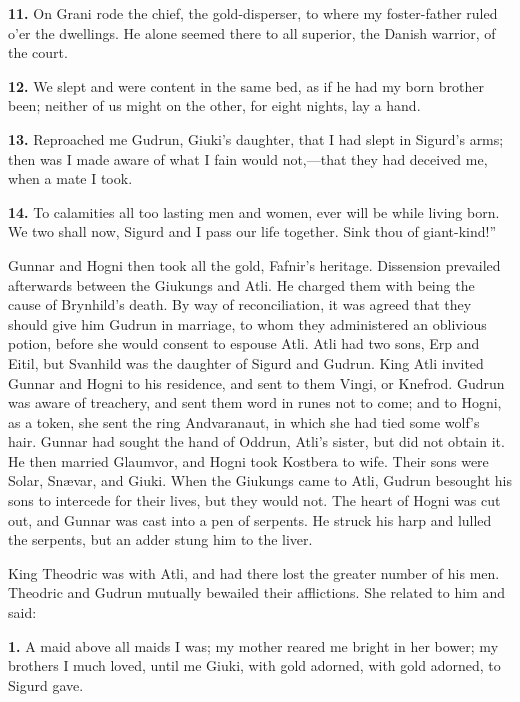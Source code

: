 \textbf{11.} On Grani rode the chief, the gold-disperser, to where my
foster-father ruled o'er the dwellings. He alone seemed there to all
superior, the Danish warrior, of the court.

\textbf{12.} We slept and were content in the same bed, as if he had my born
brother been; neither of us might on the other, for eight nights, lay
a hand.

\textbf{13.} Reproached me Gudrun, Giuki's daughter, that I had slept in
Sigurd's arms; then was I made aware of what I fain would not,—that
they had deceived me, when a mate I took.

\textbf{14.} To calamities all too lasting men and women, ever will be while
living born. We two shall now, Sigurd and I pass our life together.
Sink thou of giant-kind!''


Gunnar and Hogni then took all the gold, Fafnir's heritage. Dissension
prevailed afterwards between the Giukungs and Atli. He charged them
with being the cause of Brynhild's death. By way of reconciliation, it
was agreed that they should give him Gudrun in marriage, to whom they
administered an oblivious potion, before she would consent to espouse
Atli. Atli had two sons, Erp and Eitil, but Svanhild was the daughter
of Sigurd and Gudrun. King Atli invited Gunnar and Hogni to his
residence, and sent to them Vingi, or Knefrod. Gudrun was aware of
treachery, and sent them word in runes not to come; and to Hogni, as a
token, she sent the ring Andvaranaut, in which she had tied some
wolf's hair. Gunnar had sought the hand of Oddrun, Atli's sister, but
did not obtain it. He then married Glaumvor, and Hogni took Kostbera
to wife. Their sons were Solar, Snævar, and Giuki. When the Giukungs
came to Atli, Gudrun besought his sons to intercede for their lives,
but they would not. The heart of Hogni was cut out, and Gunnar was
cast into a pen of serpents. He struck his harp and lulled the
serpents, but an adder stung him to the liver.


King Theodric was with Atli, and had there lost the greater number of
his men. Theodric and Gudrun mutually bewailed their afflictions. She
related to him and said:

\textbf{1.} A maid above all maids I was; my mother reared me bright in her
bower; my brothers I much loved, until me Giuki, with gold adorned,
with gold adorned, to Sigurd gave.


